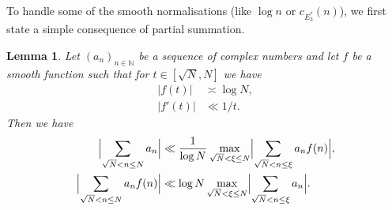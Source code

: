 \documentclass[12pt]{amsart}
\newtheorem{lemma}[theorem]{Lemma}
\theoremstyle{definition}
\theoremstyle{remark}
\numberwithin{equation}{section}
\newcommand{\1}{\mathbf{1}}
\newcommand{\N}{{\mathbb N}}
\begin{document}
To handle some of the smooth normalisations (like $\log n$ or $c_{E_3^*}(n)$), we first state a simple consequence of partial summation.
\begin{lemma}\label{lem:partsum}
    Let $(a_n)_{n\in\N}$ be a sequence of complex numbers and let $f$ be a smooth function such that for $t\in [\sqrt N,N]$ we have
    \begin{align*}
        |f(t)|&\asymp \log N,\\
        |f'(t)|&\ll 1/t.
    \end{align*}
    Then we have
    \begin{align*}
        \Bigl|\sum_{\sqrt{N}<n\leq N}a_n\Bigr|&\ll \frac{1}{\log N}\max_{\sqrt N<\xi\leq N} \Bigl|\sum_{\sqrt{N}<n\leq \xi} a_n f(n) \Bigr|, \\
         \Bigl|\sum_{\sqrt{N}<n\leq N}a_n f(n)\Bigr|&\ll \log N \max_{\sqrt N<\xi\leq N} \Bigl|\sum_{\sqrt{N}<n\leq \xi} a_n  \Bigr|.
    \end{align*}
\end{lemma}
\end{document}

